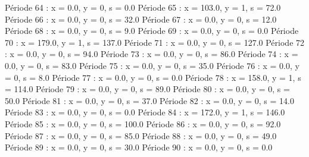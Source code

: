 Période 64 : x = 0.0, y = 0, s = 0.0
Période 65 : x = 103.0, y = 1, s = 72.0
Période 66 : x = 0.0, y = 0, s = 32.0
Période 67 : x = 0.0, y = 0, s = 12.0
Période 68 : x = 0.0, y = 0, s = 9.0
Période 69 : x = 0.0, y = 0, s = 0.0
Période 70 : x = 179.0, y = 1, s = 137.0
Période 71 : x = 0.0, y = 0, s = 127.0
Période 72 : x = 0.0, y = 0, s = 94.0
Période 73 : x = 0.0, y = 0, s = 86.0
Période 74 : x = 0.0, y = 0, s = 83.0
Période 75 : x = 0.0, y = 0, s = 35.0
Période 76 : x = 0.0, y = 0, s = 8.0
Période 77 : x = 0.0, y = 0, s = 0.0
Période 78 : x = 158.0, y = 1, s = 114.0
Période 79 : x = 0.0, y = 0, s = 89.0
Période 80 : x = 0.0, y = 0, s = 50.0
Période 81 : x = 0.0, y = 0, s = 37.0
Période 82 : x = 0.0, y = 0, s = 14.0
Période 83 : x = 0.0, y = 0, s = 0.0
Période 84 : x = 172.0, y = 1, s = 146.0
Période 85 : x = 0.0, y = 0, s = 100.0
Période 86 : x = 0.0, y = 0, s = 92.0
Période 87 : x = 0.0, y = 0, s = 85.0
Période 88 : x = 0.0, y = 0, s = 49.0
Période 89 : x = 0.0, y = 0, s = 30.0
Période 90 : x = 0.0, y = 0, s = 0.0



